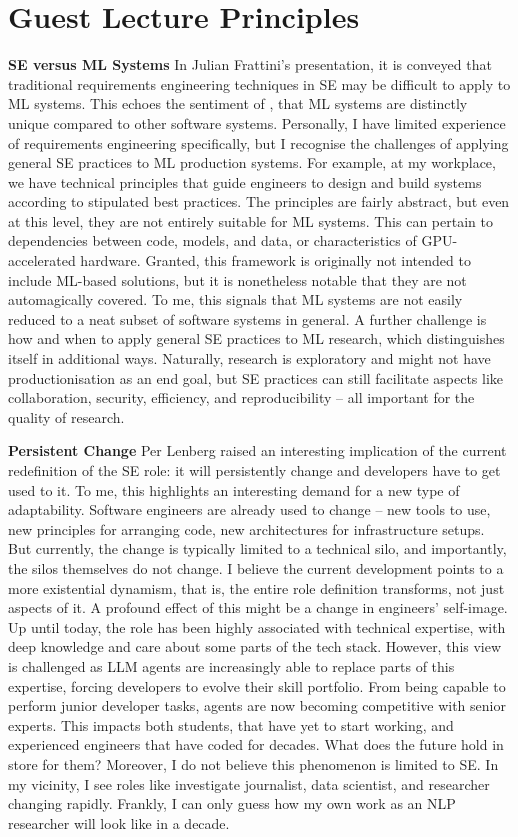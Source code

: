 \documentclass[11pt]{article}
\begin{document}
\section{Guest Lecture Principles}
\textbf{SE versus ML Systems} In Julian Frattini's presentation, it is conveyed that traditional requirements engineering techniques in SE may be difficult to apply to ML systems. This echoes the sentiment of \citet{sculleyHiddenTechnicalDebt2015}, that ML systems are distinctly unique compared to other software systems. Personally, I have limited experience of requirements engineering specifically, but I recognise the challenges of applying general SE practices to ML production systems. For example, at my workplace, we have technical principles that guide engineers to design and build systems according to stipulated best practices. The principles are fairly abstract, but even at this level, they are not entirely suitable for ML systems. This can pertain to dependencies between code, models, and data, or characteristics of GPU-accelerated hardware. Granted, this framework is originally not intended to include ML-based solutions, but it is nonetheless notable that they are not automagically covered. To me, this signals that ML systems are not easily reduced to a neat subset of software systems in general. A further challenge is how and when to apply general SE practices to ML research, which distinguishes itself in additional ways. Naturally, research is exploratory and might not have productionisation as an end goal, but SE practices can still facilitate aspects like collaboration, security, efficiency, and reproducibility – all important for the quality of research.

\textbf{Persistent Change} Per Lenberg raised an interesting implication of the current redefinition of the SE role: it will persistently change and developers have to get used to it. To me, this highlights an interesting demand for a new type of adaptability. Software engineers are already used to change – new tools to use, new principles for arranging code, new architectures for infrastructure setups. But currently, the change is typically limited to a technical silo, and importantly, the silos themselves do not change. I believe the current development points to a more existential dynamism, that is, the entire role definition transforms, not just aspects of it. A profound effect of this might be a change in engineers' self-image. Up until today, the role has been highly associated with technical expertise, with deep knowledge and care about some parts of the tech stack. However, this view is challenged as LLM agents are increasingly able to replace parts of this expertise, forcing developers to evolve their skill portfolio. From being capable to perform junior developer tasks, agents are now becoming competitive with senior experts. This impacts both students, that have yet to start working, and experienced engineers that have coded for decades. What does the future hold in store for them? Moreover, I do not believe this phenomenon is limited to SE. In my vicinity,  I see roles like investigate journalist, data scientist, and researcher changing rapidly. Frankly, I can only guess how my own work as an NLP researcher will look like in a decade.
\end{document}
